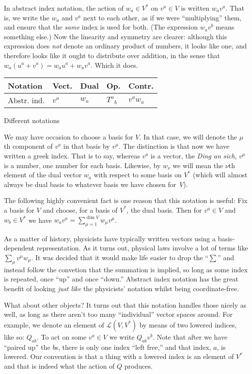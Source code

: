 \documentclass[10pt, a4paper]{article}
\begin{document}
In abstract index notation, the action of $w_a\in V^*$ on $v^a\in V$ is
written $w_av^a$. That is, we write the $w_a$ and $v^a$ next to each
other, as if we were “multiplying” them, and ensure that the
\emph{same} index is used for both. (The expression $w_av^b$ means
something else.) Now the linearity and symmetry are clearer: although
this expression does \emph{not} denote an ordinary product of numbers,
it looks like one, and therefore looks like it ought to distribute
over addition, in the sense that $w_a(u^a+v^a) = w_au^a +
w_av^a$. Which it does.

\begin{margintable}
  \centering
  \begin{tabular}{@{}lllll@{}}
    \toprule
    Notation & Vect. & Dual & Op. & Contr. \\
    \midrule
    Abstr. ind. & $v^a$ & $w_a$ & $T^a{}_b$ & $v^a w_a$ \\
    \bottomrule
  \end{tabular}
  \caption{Different notations}
  \label{tab:notation}
\end{margintable}


We may have occasion to choose a basis for $V$. In that case, we will
denote the $\mu$th component of $v^a$ in that basis by $v^\mu$. The
distinction is that now we have written a greek index. That is to say,
whereas $v^a$ is a vector, the \emph{Ding an sich}, $v^\mu$ is a number,
one number for each basis. Likewise, by $w_\nu$ we will mean the
$\nu$th element of the dual vector $w_a$ with respect to some basis
on $V^*$ (which will almost always be dual basis to whatever basis we
have chosen for~$V$).

The following highly convenient fact is one reason that this notation
is useful: Fix a basis for $V$ and choose, for a basis of $V^*$, the
dual basis. Then for $v^a\in V$ and $w_b\in V^*$ we have
$w_av^a = \sum_{\mu=1}^{\dim V} w_\mu v^\mu$.

As a matter of history, physicists have typically written vectors
using a basis-dependent representation. As it turns out, physical laws
involve a lot of terms like $\sum_\mu v^\mu w_\mu$. It was decided that it
would make life easier to drop the “$\sum$” and instead follow the
convetion that the summation is implied, so long as some index is
repeated, once “up” and once “down.” Abstract index notation has the
great benefit of looking \emph{just like} the physicists' notation
whilst being coordinate-free.

What about other objects? It turns out that this notation handles
those nicely as well, as long as there aren't too many “individual”
vector spaces around. For example, we denote an element of
$\mathcal{L}(V,V^*)$ by means of two lowered indices, like so:
$Q_{ab}$. To act on some $v^a\in V$ we write $Q_{ab}v^b$. Note that
after we have “paired up” the $b$s, there is only one index “left
free,” and that index, $a$, is lowered. Our convention is that a thing
with a lowered index is an element of $V^*$ and that is indeed what
the action of $Q$ produces.
\end{document}
